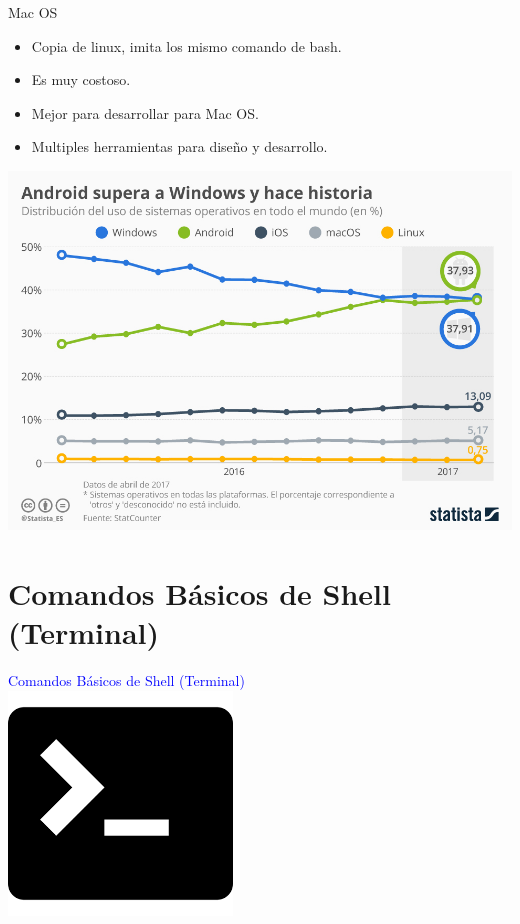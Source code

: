 \documentclass[10pt,xcolor={dvipsnames}]{beamer}
\begin{document}
\begin{frame}{Mac OS}
\begin{center}
\begin{itemize}
\item<4-|alert@4> Copia de linux, imita los mismo comando de bash.
\item<5-|alert@5> Es muy costoso.
\item<6-|alert@6> Mejor para desarrollar para Mac OS.
\item<7-|alert@7> Multiples herramientas para diseño y desarrollo.
\end{itemize}
\end{center}
\end{frame}

\begin{frame}
\includegraphics[scale=0.28]{Figures/SOMasUsado}
\end{frame}

\section{Comandos Básicos de Shell (Terminal)}
\begin{frame}
\begin{center}
\Huge{\textcolor{blue}{Comandos Básicos de Shell (Terminal)}} \\ \vspace{0.5cm}
\includegraphics[scale=0.4]{Figures/terminal}
\end{center}
\end{frame}
\end{document}
